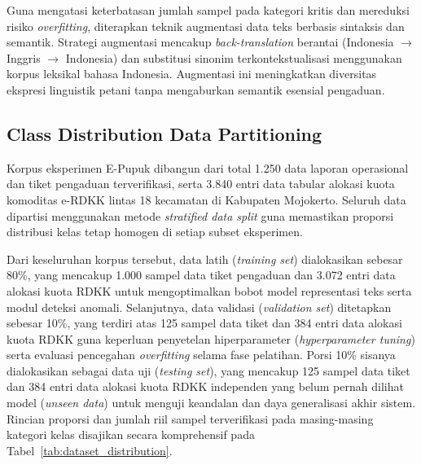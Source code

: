 \documentclass[conference]{IEEEtran}
\begin{document}
Guna mengatasi keterbatasan jumlah sampel pada kategori kritis dan mereduksi risiko \textit{overfitting}, diterapkan teknik augmentasi data teks berbasis sintaksis dan semantik. Strategi augmentasi mencakup \textit{back-translation} berantai (Indonesia $\rightarrow$ Inggris $\rightarrow$ Indonesia) dan substitusi sinonim terkontekstualisasi menggunakan korpus leksikal bahasa Indonesia. Augmentasi ini meningkatkan diversitas ekspresi linguistik petani tanpa mengaburkan semantik esensial pengaduan.

\subsection{Class Distribution Data Partitioning}
Korpus eksperimen E-Pupuk dibangun dari total 1.250 data laporan operasional dan tiket pengaduan terverifikasi, serta 3.840 entri data tabular alokasi kuota komoditas e-RDKK lintas 18 kecamatan di Kabupaten Mojokerto. Seluruh data dipartisi menggunakan metode \textit{stratified data split} guna memastikan proporsi distribusi kelas tetap homogen di setiap subset eksperimen.

Dari keseluruhan korpus tersebut, data latih (\textit{training set}) dialokasikan sebesar 80\%, yang mencakup 1.000 sampel data tiket pengaduan dan 3.072 entri data alokasi kuota RDKK untuk mengoptimalkan bobot model representasi teks serta modul deteksi anomali. Selanjutnya, data validasi (\textit{validation set}) ditetapkan sebesar 10\%, yang terdiri atas 125 sampel data tiket dan 384 entri data alokasi kuota RDKK guna keperluan penyetelan hiperparameter (\textit{hyperparameter tuning}) serta evaluasi pencegahan \textit{overfitting} selama fase pelatihan. Porsi 10\% sisanya dialokasikan sebagai data uji (\textit{testing set}), yang mencakup 125 sampel data tiket dan 384 entri data alokasi kuota RDKK independen yang belum pernah dilihat model (\textit{unseen data}) untuk menguji keandalan dan daya generalisasi akhir sistem. Rincian proporsi dan jumlah riil sampel terverifikasi pada masing-masing kategori kelas disajikan secara komprehensif pada Tabel~\ref{tab:dataset_distribution}.
\end{document}
